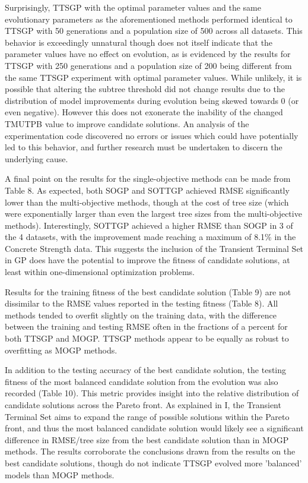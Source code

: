 \documentclass[a4paper, twocolumn]{article}
\begin{document}
Surprisingly, TTSGP with the optimal parameter values and the same evolutionary parameters as the aforementioned methods performed identical to TTSGP with 50 generations and a population size of 500 across all datasets. This behavior is exceedingly unnatural though does not itself indicate that the parameter values have no effect on evolution, as is evidenced by the results for TTSGP with 250 generations and a population size of 200 being different from the same TTSGP experiment with optimal parameter values. While unlikely, it is possible that altering the subtree threshold did not change results due to the distribution of model improvements during evolution being skewed towards 0 (or even negative). However this does not exonerate the inability of the changed TMUTPB value to improve candidate solutions. An analysis of the experimentation code discovered no errors or issues which could have potentially led to this behavior, and further research must be undertaken to discern the underlying cause.

A final point on the results for the single-objective methods can be made from Table 8. As expected, both SOGP and SOTTGP achieved RMSE significantly lower than the multi-objective methods, though at the cost of tree size (which were exponentially larger than even the largest tree sizes from the multi-objective methods). Interestingly, SOTTGP achieved a higher RMSE than SOGP in 3 of the 4 datasets, with the improvement made reaching a maximum of 8.1\% in the Concrete Strength data. This suggests the inclusion of the Transient Terminal Set in GP does have the potential to improve the fitness of candidate solutions, at least within one-dimensional optimization problems.

Results for the training fitness of the best candidate solution (Table 9) are not dissimilar to the RMSE values reported in the testing fitness (Table 8). All methods tended to overfit slightly on the training data, with the difference between the training and testing RMSE often in the fractions of a percent for both TTSGP and MOGP. TTSGP methods appear to be equally as robust to overfitting as MOGP methods.

In addition to the testing accuracy of the best candidate solution, the testing fitness of the most balanced candidate solution from the evolution was also recorded (Table 10). This metric provides insight into the relative distribution of candidate solutions across the Pareto front. As explained in I, the Transient Terminal Set aims to expand the range of possible solutions within the Pareto front, and thus the most balanced candidate solution would likely see a significant difference in RMSE/tree size from the best candidate solution than in MOGP methods. The results corroborate the conclusions drawn from the results on the best candidate solutions, though do not indicate TTSGP evolved more 'balanced' models than MOGP methods.
\end{document}
